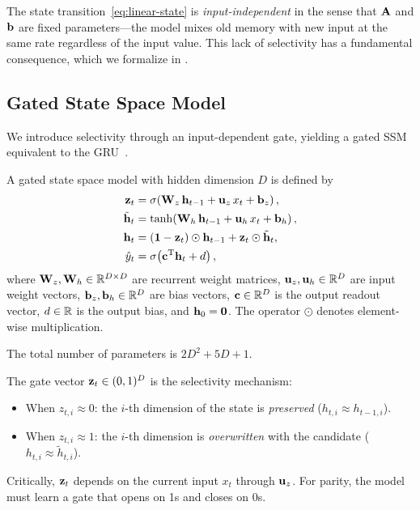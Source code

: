 \documentclass[11pt]{article}
\newcommand\hh{\mathbf{h}}
\newcommand{\sigmoid}{\sigma}
\begin{document}
The state transition~\eqref{eq:linear-state} is \emph{input-independent} in the sense that $\AA$ and $\bb$ are fixed parameters---the model mixes old memory with new input at the same rate regardless of the input value.
This lack of selectivity has a fundamental consequence, which we formalize in .


\subsection{Gated State Space Model}
\label{sec:gated-ssm}

We introduce selectivity through an input-dependent gate, yielding a gated SSM equivalent to the GRU~\citep{cho2014learning}.

\begin{definition}
\label{def:gated-ssm}
A gated state space model with hidden dimension $D$ is defined by
\begin{align}
    \zz_t &= \sigmoid\!\rb{\WW_z\, \hh_{t-1} + \uu_z\, x_t + \bb_z}, \label{eq:gate}\\
    \tilde{\hh}_t &= \tanh\!\rb{\WW_h\, \hh_{t-1} + \uu_h\, x_t + \bb_h}, \label{eq:candidate}\\
    \hh_t &= (\mathbf{1} - \zz_t) \odot \hh_{t-1} + \zz_t \odot \tilde{\hh}_t, \label{eq:gated-update}\\
    \hat{y}_t &= \sigmoid\!\rb{\cc^\transpose \hh_t + d}, \label{eq:gated-output}
\end{align}
where $\WW_z, \WW_h \in \R^{D \times D}$ are recurrent weight matrices, $\uu_z, \uu_h \in \R^D$ are input weight vectors, $\bb_z, \bb_h \in \R^D$ are bias vectors, $\cc \in \R^D$ is the output readout vector, $d \in \R$ is the output bias, and $\hh_0 = \zeroVec$.
The operator $\odot$ denotes element-wise multiplication.
\end{definition}

The total number of parameters is $2D^2 + 5D + 1$.

The gate vector $\zz_t \in (0,1)^D$ is the selectivity mechanism:
\begin{itemize}
    \item When $z_{t,i} \approx 0$: the $i$-th dimension of the state is \emph{preserved} ($h_{t,i} \approx h_{t-1,i}$).
    \item When $z_{t,i} \approx 1$: the $i$-th dimension is \emph{overwritten} with the candidate ($h_{t,i} \approx \tilde{h}_{t,i}$).
\end{itemize}
Critically, $\zz_t$ depends on the current input $x_t$ through $\uu_z$.
For parity, the model must learn a gate that opens on 1s and closes on 0s.
\end{document}
